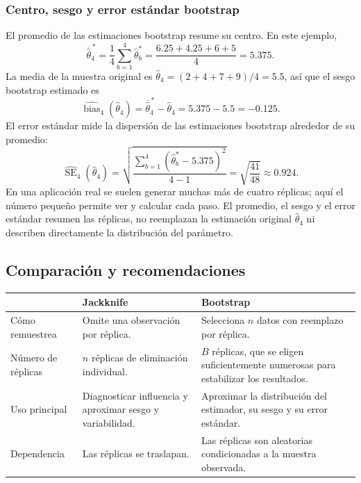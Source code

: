 

\subsubsection{Centro, sesgo y error estándar bootstrap}

El promedio de las estimaciones bootstrap resume su centro. En este ejemplo,
\[
    \overline{\widehat\theta}^{\,*}_4
    =\frac{1}{4}\sum_{b=1}^{4}\widehat\theta_b^*
    =\frac{6.25+4.25+6+5}{4}=5.375.
\]
La media de la muestra original es
$\widehat\theta_4=(2+4+7+9)/4=5.5$, así que el sesgo bootstrap estimado es
\[
    \widehat{\operatorname{bias}}_4(\widehat\theta_4)
    =\overline{\widehat\theta}^{\,*}_4-\widehat\theta_4
    =5.375-5.5=-0.125.
\]
El error estándar mide la dispersión de las estimaciones bootstrap alrededor
de su promedio:
\[
    \widehat{\operatorname{SE}}_4(\widehat\theta_4)
    =\sqrt{\frac{\sum_{b=1}^{4}
       (\widehat\theta_b^*-5.375)^2}{4-1}}
    =\sqrt{\frac{41}{48}}\approx0.924.
\]
En una aplicación real se suelen generar muchas más de cuatro réplicas; aquí
el número pequeño permite ver y calcular cada paso. El promedio, el sesgo y el
error estándar resumen las réplicas, no reemplazan la estimación original
$\widehat\theta_4$ ni describen directamente la distribución del parámetro.

\subsection{Comparación y recomendaciones}

\begin{center}
\begin{tabularx}{\linewidth}{@{}l>{\raggedright\arraybackslash}X>{\raggedright\arraybackslash}X@{}}
    \toprule
    & \textbf{Jackknife} & \textbf{Bootstrap}\\
    \midrule
    Cómo remuestrea & Omite una observación por réplica. & Selecciona $n$ datos con reemplazo por réplica.\\
    Número de réplicas & $n$ réplicas de eliminación individual. & $B$ réplicas, que se eligen suficientemente numerosas para estabilizar los resultados.\\
    Uso principal & Diagnosticar influencia y aproximar sesgo y variabilidad. & Aproximar la distribución del estimador, su sesgo y su error estándar.\\
    Dependencia & Las réplicas se traslapan. & Las réplicas son aleatorias condicionadas a la muestra observada.\\
    \bottomrule
\end{tabularx}
\end{center}

